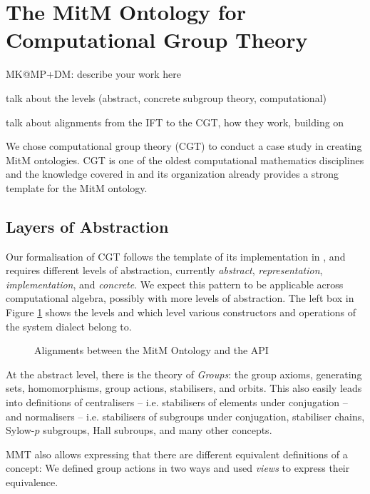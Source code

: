 \section{The MitM Ontology for Computational Group Theory}\label{sec:cgt}
\begin{todolist}{MK@MP+DM: describe your work here}
\item talk about the levels (abstract, concrete subgroup theory, computational)
\item talk about alignments from the IFT to the CGT, how they work, building
  on~\cite{MueRoYuRa:abtafs17,MueGauKal:cacfms17} 
\end{todolist}

We chose computational group theory (CGT) to conduct a case study in creating MitM
ontologies. CGT is one of the oldest computational mathematics disciplines and the
knowledge covered in \GAP and its organization already provides a strong template for the
MitM ontology.

\subsection{Layers of Abstraction}

Our formalisation of CGT follows the template of its implementation in \GAP, and requires
different levels of abstraction, currently \emph{abstract}, \emph{representation},
\emph{implementation}, and \emph{concrete}.  We expect this pattern to be applicable
across computational algebra, possibly with more levels of abstraction. The left box in
Figure \ref{fig:cgtontology} shows the levels and which level various constructors and
operations of the \GAP system dialect belong to. 

\begin{figure}[ht]\centering
  \caption{Alignments between the MitM Ontology and the \GAP API}\label{fig:cgtontology}
\end{figure}

At the abstract level, there is the theory of \emph{Groups}: the group axioms, generating
sets, homomorphisms, group actions, stabilisers, and orbits. This also easily leads into
definitions of centralisers -- i.e. stabilisers of elements under conjugation -- and
normalisers -- i.e. stabilisers of subgroups under conjugation, stabiliser chains,
Sylow-$p$ subgroups, Hall subroups, and many other concepts.

MMT also allows expressing that there are different equivalent definitions of a
concept: We defined group actions in two ways and used \emph{views} to express
their equivalence.


